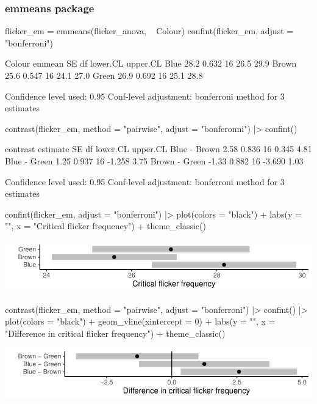 \documentclass[a4paper]{article}\usepackage[]{graphicx}\usepackage[]{xcolor}
\makeatletter
\def\maxwidth{ %
  \ifdim\Gin@nat@width>\linewidth
    \linewidth
  \else
    \Gin@nat@width
  \fi
}
\makeatother
\begin{document}
\subsubsection{emmeans package}
\begin{Schunk}
\begin{Sinput}
flicker_em = emmeans(flicker_anova, ~ Colour)
confint(flicker_em, adjust = "bonferroni")
\end{Sinput}
\begin{Soutput}
 Colour emmean    SE df lower.CL upper.CL
 Blue     28.2 0.632 16     26.5     29.9
 Brown    25.6 0.547 16     24.1     27.0
 Green    26.9 0.692 16     25.1     28.8

Confidence level used: 0.95 
Conf-level adjustment: bonferroni method for 3 estimates 
\end{Soutput}
\begin{Sinput}
contrast(flicker_em, method = "pairwise", adjust = "bonferonni") |> confint() 
\end{Sinput}
\begin{Soutput}
 contrast      estimate    SE df lower.CL upper.CL
 Blue - Brown      2.58 0.836 16    0.345     4.81
 Blue - Green      1.25 0.937 16   -1.258     3.75
 Brown - Green    -1.33 0.882 16   -3.690     1.03

Confidence level used: 0.95 
Conf-level adjustment: bonferroni method for 3 estimates 
\end{Soutput}
\begin{Sinput}
confint(flicker_em, adjust = "bonferroni") |> plot(colors = "black") + 
  labs(y = "", x = "Critical flicker frequency") +
  theme_classic()
\end{Sinput}


{\centering \includegraphics[width=\maxwidth]{figure/listings-unnamed-chunk-248-1} 

}

\begin{Sinput}
contrast(flicker_em, method = "pairwise", adjust = "bonferroni") |> confint()  |> 
  plot(colors = "black") + geom_vline(xintercept = 0) + 
  labs(y = "", x = "Difference in critical flicker frequency") +
  theme_classic()
\end{Sinput}


{\centering \includegraphics[width=\maxwidth]{figure/listings-unnamed-chunk-248-2} 

}

\end{Schunk}
\end{document}
